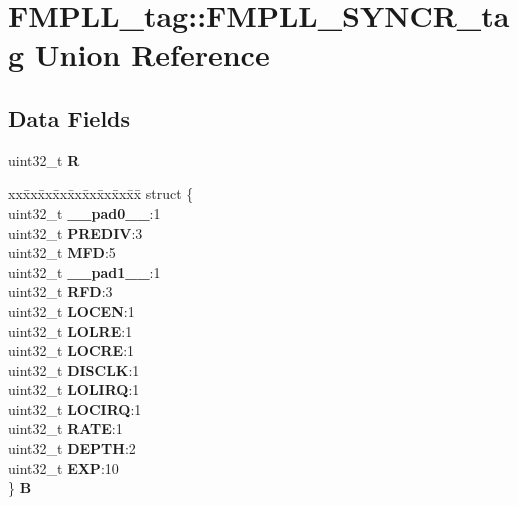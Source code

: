 \hypertarget{unionFMPLL__tag_1_1FMPLL__SYNCR__tag}{}\section{F\+M\+P\+L\+L\+\_\+tag\+::F\+M\+P\+L\+L\+\_\+\+S\+Y\+N\+C\+R\+\_\+tag Union Reference}
\label{unionFMPLL__tag_1_1FMPLL__SYNCR__tag}
\subsection*{Data Fields}
\begin{DoxyCompactItemize}
\item 
\mbox{\label{unionFMPLL__tag_1_1FMPLL__SYNCR__tag_a1e007c9cf47ab06566d07bf935dde169}} 
uint32\+\_\+t {\bfseries R}
\item 
\mbox{\label{unionFMPLL__tag_1_1FMPLL__SYNCR__tag_a8771c6334bf84559c9e9ed7b43bace65}} 
\begin{tabbing}
xx\=xx\=xx\=xx\=xx\=xx\=xx\=xx\=xx\=\kill
struct \{\\
\>uint32\_t {\bfseries \_\_pad0\_\_}:1\\
\>uint32\_t {\bfseries PREDIV}:3\\
\>uint32\_t {\bfseries MFD}:5\\
\>uint32\_t {\bfseries \_\_pad1\_\_}:1\\
\>uint32\_t {\bfseries RFD}:3\\
\>uint32\_t {\bfseries LOCEN}:1\\
\>uint32\_t {\bfseries LOLRE}:1\\
\>uint32\_t {\bfseries LOCRE}:1\\
\>uint32\_t {\bfseries DISCLK}:1\\
\>uint32\_t {\bfseries LOLIRQ}:1\\
\>uint32\_t {\bfseries LOCIRQ}:1\\
\>uint32\_t {\bfseries RATE}:1\\
\>uint32\_t {\bfseries DEPTH}:2\\
\>uint32\_t {\bfseries EXP}:10\\
\} {\bfseries B}\\


\end{tabbing}
\end{DoxyCompactItemize}

